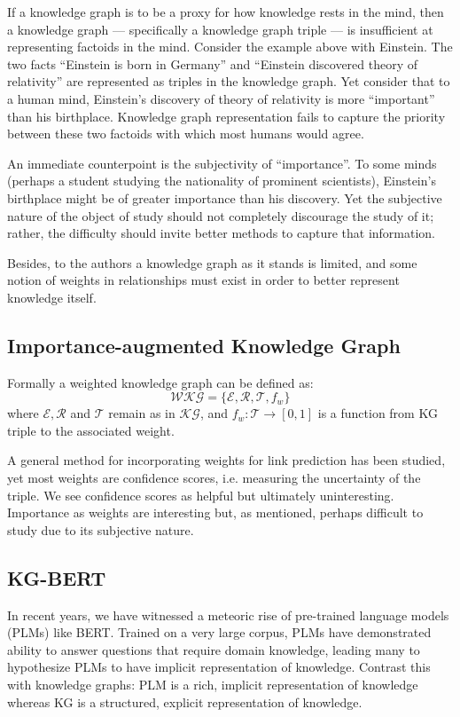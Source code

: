 \documentclass{article}
\begin{document}
If a knowledge graph is to be a proxy for how knowledge rests in the mind, then a knowledge graph --- specifically a knowledge graph triple --- is insufficient at representing factoids in the mind. Consider the example above with Einstein. The two facts ``Einstein is born in Germany'' and ``Einstein discovered theory of relativity'' are represented as triples in the knowledge graph. Yet consider that to a human mind, Einstein's discovery of theory of relativity is more ``important'' than his birthplace. Knowledge graph representation fails to capture the priority between these two factoids with which most humans would agree.

An immediate counterpoint is the subjectivity of ``importance''. To some minds (perhaps a student studying the nationality of prominent scientists), Einstein's birthplace might be of greater importance than his discovery. Yet the subjective nature of the object of study should not completely discourage the study of it; rather, the difficulty should invite better methods to capture that information.

Besides, to the authors a knowledge graph as it stands is limited, and some notion of weights in relationships must exist in order to better represent knowledge itself.

\subsection{Importance-augmented Knowledge Graph}
Formally a weighted knowledge graph can be defined as:
\begin{equation*}
  \mathcal{WKG} = \{\mathcal{E}, \mathcal{R}, \mathcal{T}, f_w\}
\end{equation*}
where $\mathcal{E}, \mathcal{R}$ and $\mathcal{T}$ remain as in $\mathcal{KG}$, and $f_w : \mathcal{T} \to [0,1]$ is a function from KG triple to the associated weight.

A general method for incorporating weights for link prediction has been studied\cite{nayyeri2021link}, yet most weights are confidence scores, i.e. measuring the uncertainty of the triple. We see confidence scores as helpful but ultimately uninteresting. Importance as weights are interesting but, as mentioned, perhaps difficult to study due to its subjective nature.

\subsection{KG-BERT\cite{https://doi.org/10.48550/arxiv.1909.03193}}
In recent years, we have witnessed a meteoric rise of pre-trained language models (PLMs) like BERT\cite{devlin-etal-2019-bert}. Trained on a very large corpus, PLMs have demonstrated ability to answer questions that require domain knowledge, leading many to hypothesize PLMs to have implicit representation of knowledge. Contrast this with knowledge graphs: PLM is a rich, implicit representation of knowledge whereas KG is a structured, explicit representation of knowledge.
\end{document}

